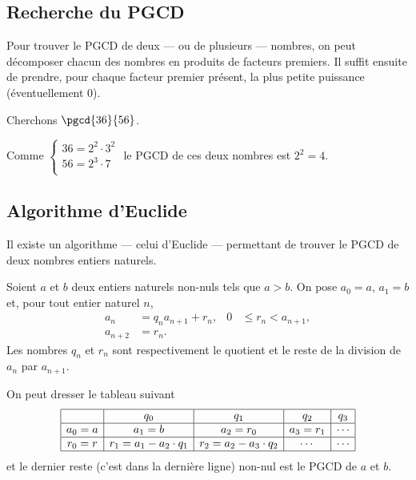       \subsection*{Recherche du PGCD}
            Pour trouver le PGCD de deux --- ou de plusieurs --- nombres, 
            on peut d\'ecomposer chacun des nombres en produits de facteurs premiers.
            Il suffit ensuite de prendre, pour chaque facteur premier pr\'esent, la plus petite puissance
            (\'eventuellement $0$).
            
            \begin{ex}
                  Cherchons $\pgcd{36}{56}$.
                  
                  Comme 
                  $
                  \left\lbrace
                  \begin{array}{l}
                        36 = 2^2 \cdot 3^2 \\
                        56 = 2^3 \cdot 7 \\
                  \end{array}
                  \right.
                  $
                  le PGCD de ces deux nombres est $2^2 = 4$.
            \end{ex}
      \subsection*{Algorithme d'Euclide}
            Il existe un algorithme --- celui d'Euclide --- permettant de trouver le PGCD de deux nombres entiers naturels.
            
            Soient $a$ et $b$ deux entiers naturels non-nuls tels que $a>b$.
            On pose $a_0=a$, $a_1=b$ et, pour tout entier naturel $n$,
            \[
              \begin{aligned}
                a_n &= q_n a_{n+1}+r_n,
                & 0 &\leq r_n<a_{n+1}, \\
                a_{n+2} &= r_n.
              \end{aligned}
            \]
            Les nombres $q_n$ et $r_n$ sont respectivement le quotient et le
            reste de la division de $a_n$ par $a_{n+1}$.
                  
            On peut dresser le tableau suivant
            \[
            \begin{array}{|c|c|c|c|c|}
            \hline 
              & q_0 & q_1 & q_2 & q_3 \\ 
            \hline 
            a_0 = a & a_1 = b & a_2 = r_0 & a_3 = r_1  & \cdots \\ 
            \hline 
            r_0 = r & r_1 = a_1 - a_2 \cdot q_1 & r_2 = a_2 - a_3 \cdot q_2 & \cdots & \cdots \\ 
            \hline 
            \end{array} 
            \]
            et le dernier reste (c'est dans la derni\`ere ligne) non-nul est le PGCD de $a$ et $b$.
            
